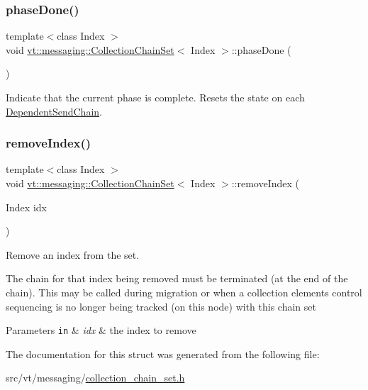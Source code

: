 \subsubsection{\texorpdfstring{phase\+Done()}{phaseDone()}}
{\footnotesize\ttfamily template$<$class Index $>$ \\
void \hyperlink{classvt_1_1messaging_1_1_collection_chain_set}{vt\+::messaging\+::\+Collection\+Chain\+Set}$<$ Index $>$\+::phase\+Done (\begin{DoxyParamCaption}{ }\end{DoxyParamCaption})\hspace{0.3cm}{\ttfamily [inline]}}



Indicate that the current phase is complete. Resets the state on each {\ttfamily \hyperlink{classvt_1_1messaging_1_1_dependent_send_chain}{Dependent\+Send\+Chain}}. 

\mbox{\label{classvt_1_1messaging_1_1_collection_chain_set_a299e52c482aba47bcdabe796d236c043}} 
\subsubsection{\texorpdfstring{remove\+Index()}{removeIndex()}}
{\footnotesize\ttfamily template$<$class Index $>$ \\
void \hyperlink{classvt_1_1messaging_1_1_collection_chain_set}{vt\+::messaging\+::\+Collection\+Chain\+Set}$<$ Index $>$\+::remove\+Index (\begin{DoxyParamCaption}\item[{Index}]{idx }\end{DoxyParamCaption})\hspace{0.3cm}{\ttfamily [inline]}}



Remove an index from the set. 

The chain for that index being removed must be terminated (at the end of the chain). This may be called during migration or when a collection element\textquotesingle{}s control sequencing is no longer being tracked (on this node) with this chain set


\begin{DoxyParams}[1]{Parameters}
\mbox{\tt in}  & {\em idx} & the index to remove \\
\hline
\end{DoxyParams}


The documentation for this struct was generated from the following file\+:\begin{DoxyCompactItemize}
\item 
src/vt/messaging/\hyperlink{collection__chain__set_8h}{collection\+\_\+chain\+\_\+set.\+h}\end{DoxyCompactItemize}
